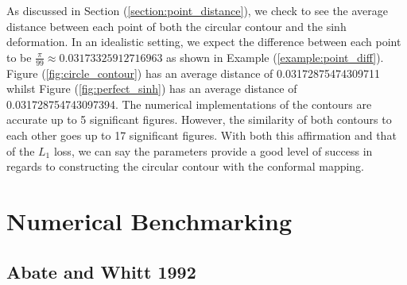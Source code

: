 \documentclass[a4paper]{report}
\begin{document}
As discussed in Section (\ref{section:point_distance}), we check to see the average distance between each point of both the circular contour and the sinh deformation. In an idealistic setting, we expect the difference between each point to be $\frac{\pi}{99} \approx 0.03173325912716963$ as shown in Example (\ref{example:point_diff}). Figure (\ref{fig:circle_contour}) has an average distance of 0.03172875474309711  whilst Figure (\ref{fig:perfect_sinh}) has an average distance of 0.031728754743097394. The numerical implementations of the contours are accurate up to 5 significant figures. However, the similarity of both contours to each other goes up to 17 significant figures. With both this affirmation and that of the $L_1$ loss, we can say the parameters provide a good level of success in regards to constructing the circular contour with the conformal mapping.

\section{Numerical Benchmarking}

\subsection{Abate and Whitt 1992}
\end{document}
